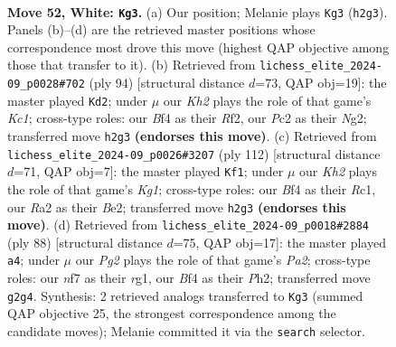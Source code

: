\documentclass[11pt]{article}
\begin{document}
\clearpage

\begin{figure}[p]\centering
\begin{subfigure}{0.46\textwidth}\centering
\resizebox{\linewidth}{!}{%
\newchessgame
\chessboard[
  setfen={5b1r/p4n1p/P5k1/3r4/5B2/1Pp4P/R1P3PK/2RB4 w - - 11 52},
  showmover=false,
  pgfstyle=straightmove, color=movearrow, markmove={h2-g3}
]}
\caption{}
\end{subfigure}\hfill
\begin{subfigure}{0.46\textwidth}\centering
\resizebox{\linewidth}{!}{%
\newchessgame
\chessboard[
  setfen={6b1/1kp5/5R1P/8/p1p5/P1PpB2r/1P3RN1/2K5 w - - 2 48},
  showmover=false,
  pgfstyle=straightmove, color=movearrow, markmove={c1-d2}
]}
\caption{}
\end{subfigure}
\\[4pt]
\begin{subfigure}{0.46\textwidth}\centering
\resizebox{\linewidth}{!}{%
\newchessgame
\chessboard[
  setfen={1r6/6pk/1n4p1/1P4r1/4p3/4P3/1R2BP1P/2R3K1 w - - 11 57},
  showmover=false,
  pgfstyle=straightmove, color=movearrow, markmove={g1-f1}
]}
\caption{}
\end{subfigure}\hfill
\begin{subfigure}{0.46\textwidth}\centering
\resizebox{\linewidth}{!}{%
\newchessgame
\chessboard[
  setfen={8/8/1Bp2k2/4p2b/2P2p1p/1PK2P2/P4R1P/6r1 w - - 6 45},
  showmover=false,
  pgfstyle=straightmove, color=movearrow, markmove={a2-a4}
]}
\caption{}
\end{subfigure}
\caption{\textbf{Move 52, White: \texttt{Kg3}.} (a) Our position; Melanie plays \texttt{Kg3} (\texttt{h2g3}). Panels (b)--(d) are the retrieved master positions whose correspondence most drove this move (highest QAP objective among those that transfer to it). (b) Retrieved from \texttt{lichess\_elite\_2024-09\_p0028\#702} (ply 94) [structural distance $d$=73, QAP obj=19]: the master played \texttt{Kd2}; under $\mu$ our \emph{Kh2} plays the role of that game's \emph{Kc1}; cross-type roles: our \emph{B}f4 as their \emph{R}f2, our \emph{P}c2 as their \emph{N}g2; transferred move \texttt{h2g3} \textbf{(endorses this move)}. (c) Retrieved from \texttt{lichess\_elite\_2024-09\_p0026\#3207} (ply 112) [structural distance $d$=71, QAP obj=7]: the master played \texttt{Kf1}; under $\mu$ our \emph{Kh2} plays the role of that game's \emph{Kg1}; cross-type roles: our \emph{B}f4 as their \emph{R}c1, our \emph{R}a2 as their \emph{B}e2; transferred move \texttt{h2g3} \textbf{(endorses this move)}. (d) Retrieved from \texttt{lichess\_elite\_2024-09\_p0018\#2884} (ply 88) [structural distance $d$=75, QAP obj=17]: the master played \texttt{a4}; under $\mu$ our \emph{Pg2} plays the role of that game's \emph{Pa2}; cross-type roles: our \emph{n}f7 as their \emph{r}g1, our \emph{B}f4 as their \emph{P}h2; transferred move \texttt{g2g4}. Synthesis: 2 retrieved analogs transferred to \texttt{Kg3} (summed QAP objective 25, the strongest correspondence among the candidate moves); Melanie committed it via the \texttt{search} selector.}
\label{fig:thought-m102}
\end{figure}
\end{document}
